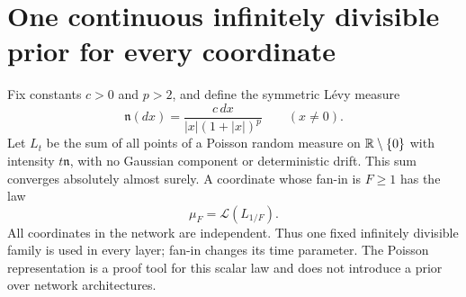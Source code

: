 \section{One continuous infinitely divisible prior for every coordinate}
\label{sec:levy-scalar}
Fix constants $c>0$ and $p>2$, and define the symmetric L\'evy measure
\[
 \mathfrak n(dx)=\frac{c\,dx}{|x|(1+|x|)^p}
 \qquad(x\ne0).
\]
Let $L_t$ be the sum of all points of a Poisson random measure on $\mathbb R\setminus\{0\}$ with intensity $t\mathfrak n$, with no Gaussian component or deterministic drift. This sum converges absolutely almost surely. A coordinate whose fan-in is $F\ge1$ has the law
\begin{equation}
 \mu_F=\mathcal L(L_{1/F}).
 \label{eq:levy-coordinate-prior}
\end{equation}
All coordinates in the network are independent. Thus one fixed infinitely divisible family is used in every layer; fan-in changes its time parameter. The Poisson representation is a proof tool for this scalar law and does not introduce a prior over network architectures.

